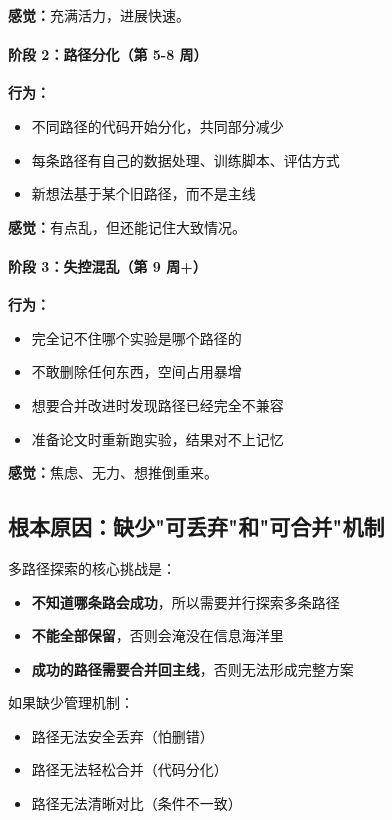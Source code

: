 \textbf{感觉：}充满活力，进展快速。

\paragraph{阶段 2：路径分化（第 5-8 周）}

\textbf{行为：}
\begin{itemize}
  \item 不同路径的代码开始分化，共同部分减少
  \item 每条路径有自己的数据处理、训练脚本、评估方式
  \item 新想法基于某个旧路径，而不是主线
\end{itemize}

\textbf{感觉：}有点乱，但还能记住大致情况。

\paragraph{阶段 3：失控混乱（第 9 周+）}

\textbf{行为：}
\begin{itemize}
  \item 完全记不住哪个实验是哪个路径的
  \item 不敢删除任何东西，空间占用暴增
  \item 想要合并改进时发现路径已经完全不兼容
  \item 准备论文时重新跑实验，结果对不上记忆
\end{itemize}

\textbf{感觉：}焦虑、无力、想推倒重来。

\subsection{根本原因：缺少"可丢弃"和"可合并"机制}

多路径探索的核心挑战是：
\begin{itemize}
  \item \textbf{不知道哪条路会成功}，所以需要并行探索多条路径
  \item \textbf{不能全部保留}，否则会淹没在信息海洋里
  \item \textbf{成功的路径需要合并回主线}，否则无法形成完整方案
\end{itemize}

如果缺少管理机制：
\begin{itemize}
  \item 路径无法安全丢弃（怕删错）
  \item 路径无法轻松合并（代码分化）
  \item 路径无法清晰对比（条件不一致）
\end{itemize}

